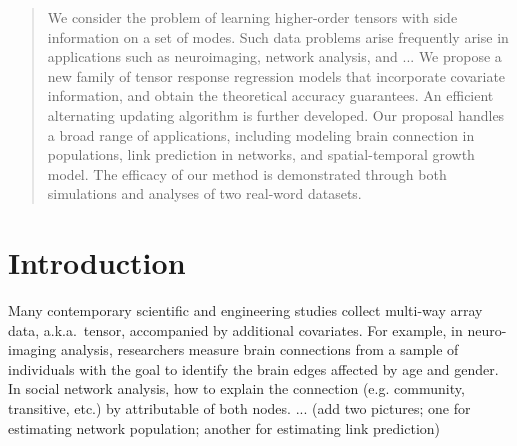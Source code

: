 \documentclass[twoside]{article}
\theoremstyle{plain}
\theoremstyle{definition}
\begin{document}
%

%


\begin{abstract}
We consider the problem of learning higher-order tensors with side information on a set of modes. Such data problems arise frequently arise in applications such as neuroimaging, network analysis, and ... We propose a new family of tensor response regression models that incorporate covariate information, and obtain the theoretical accuracy guarantees. An efficient alternating updating algorithm is further developed. Our proposal handles a broad range of applications, including modeling brain connection in populations, link prediction in networks, and spatial-temporal growth model. The efficacy of our method is demonstrated through both simulations and analyses of two real-word datasets. 
\end{abstract}

\section{Introduction}

Many contemporary scientific and engineering studies collect multi-way array data, a.k.a.\ tensor, accompanied by additional covariates. For example, in neuro-imaging analysis, researchers measure brain connections from a sample of individuals with the goal to identify the brain edges affected by age and gender. In social network analysis, how to explain the connection (e.g. community, transitive, etc.) by attributable of both nodes. ... 
(add two pictures; one for estimating network population; another for estimating link prediction)
\end{document}
